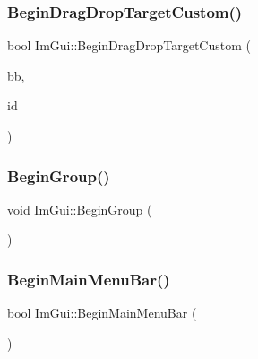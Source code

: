 \hypertarget{namespace_im_gui_a929a420d3af29051a140d0f36addbcd2}{}\label{namespace_im_gui_a929a420d3af29051a140d0f36addbcd2} 
\subsubsection{\texorpdfstring{Begin\+Drag\+Drop\+Target\+Custom()}{BeginDragDropTargetCustom()}}
{\footnotesize\ttfamily bool Im\+Gui\+::\+Begin\+Drag\+Drop\+Target\+Custom (\begin{DoxyParamCaption}\item[{const \hyperlink{struct_im_rect}{Im\+Rect} \&}]{bb,  }\item[{Im\+Gui\+ID}]{id }\end{DoxyParamCaption})}

\hypertarget{namespace_im_gui_a42407e196b7ed2a8755bff28aae9805f}{}\label{namespace_im_gui_a42407e196b7ed2a8755bff28aae9805f} 
\subsubsection{\texorpdfstring{Begin\+Group()}{BeginGroup()}}
{\footnotesize\ttfamily void Im\+Gui\+::\+Begin\+Group (\begin{DoxyParamCaption}{ }\end{DoxyParamCaption})}

\hypertarget{namespace_im_gui_a55cb9cfb9865204ac6fb21c965784f78}{}\label{namespace_im_gui_a55cb9cfb9865204ac6fb21c965784f78} 
\subsubsection{\texorpdfstring{Begin\+Main\+Menu\+Bar()}{BeginMainMenuBar()}}
{\footnotesize\ttfamily bool Im\+Gui\+::\+Begin\+Main\+Menu\+Bar (\begin{DoxyParamCaption}{ }\end{DoxyParamCaption})}

\hypertarget{namespace_im_gui_a1e55711a21f97d5dff919d697d3a7201}{}\label{namespace_im_gui_a1e55711a21f97d5dff919d697d3a7201} 
